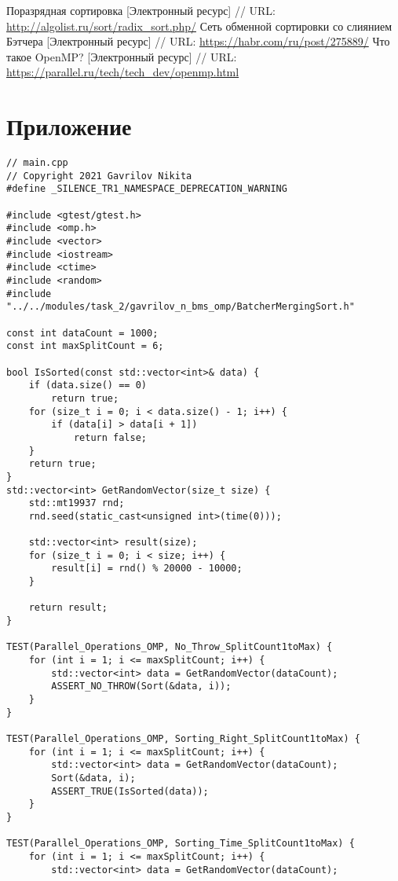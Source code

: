 \documentclass{report}
\begin{document}
\newpage
\begin{thebibliography}{1}
 Поразрядная сортировка [Электронный ресурс] // URL: \url{http://algolist.ru/sort/radix_sort.php/}
 Сеть обменной сортировки со слиянием Бэтчера [Электронный ресурс] // URL: \url{https://habr.com/ru/post/275889/}
 Что такое OpenMP? [Электронный ресурс] // URL: \url{https://parallel.ru/tech/tech_dev/openmp.html}
\end{thebibliography}

\newpage
\section*{Приложение}
\begin{lstlisting}
// main.cpp
// Copyright 2021 Gavrilov Nikita
#define _SILENCE_TR1_NAMESPACE_DEPRECATION_WARNING

#include <gtest/gtest.h>
#include <omp.h>
#include <vector>
#include <iostream>
#include <ctime>
#include <random>
#include "../../modules/task_2/gavrilov_n_bms_omp/BatcherMergingSort.h"

const int dataCount = 1000;
const int maxSplitCount = 6;

bool IsSorted(const std::vector<int>& data) {
    if (data.size() == 0)
        return true;
    for (size_t i = 0; i < data.size() - 1; i++) {
        if (data[i] > data[i + 1])
            return false;
    }
    return true;
}
std::vector<int> GetRandomVector(size_t size) {
    std::mt19937 rnd;
    rnd.seed(static_cast<unsigned int>(time(0)));

    std::vector<int> result(size);
    for (size_t i = 0; i < size; i++) {
        result[i] = rnd() % 20000 - 10000;
    }

    return result;
}

TEST(Parallel_Operations_OMP, No_Throw_SplitCount1toMax) {
    for (int i = 1; i <= maxSplitCount; i++) {
        std::vector<int> data = GetRandomVector(dataCount);
        ASSERT_NO_THROW(Sort(&data, i));
    }
}

TEST(Parallel_Operations_OMP, Sorting_Right_SplitCount1toMax) {
    for (int i = 1; i <= maxSplitCount; i++) {
        std::vector<int> data = GetRandomVector(dataCount);
        Sort(&data, i);
        ASSERT_TRUE(IsSorted(data));
    }
}

TEST(Parallel_Operations_OMP, Sorting_Time_SplitCount1toMax) {
    for (int i = 1; i <= maxSplitCount; i++) {
        std::vector<int> data = GetRandomVector(dataCount);


\end{lstlisting}
\end{document}
